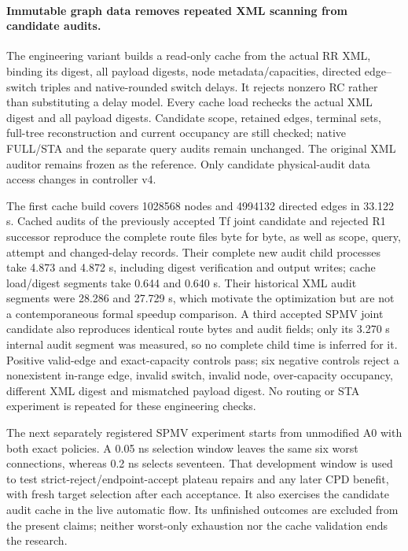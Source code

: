 \paragraph{Immutable graph data removes repeated XML scanning from candidate audits.}
The engineering variant builds a read-only cache from the actual RR XML, binding its digest, all payload digests, node metadata/capacities, directed edge--switch triples and native-rounded switch delays. It rejects nonzero RC rather than substituting a delay model. Every cache load rechecks the actual XML digest and all payload digests. Candidate scope, retained edges, terminal sets, full-tree reconstruction and current occupancy are still checked; native FULL/STA and the separate query audits remain unchanged. The original XML auditor remains frozen as the reference. Only candidate physical-audit data access changes in controller v4.

The first cache build covers 1028568 nodes and 4994132 directed edges in 33.122 s. Cached audits of the previously accepted Tf joint candidate and rejected R1 successor reproduce the complete route files byte for byte, as well as scope, query, attempt and changed-delay records. Their complete new audit child processes take 4.873 and 4.872 s, including digest verification and output writes; cache load/digest segments take 0.644 and 0.640 s. Their historical XML audit segments were 28.286 and 27.729 s, which motivate the optimization but are not a contemporaneous formal speedup comparison. A third accepted SPMV joint candidate also reproduces identical route bytes and audit fields; only its 3.270 s internal audit segment was measured, so no complete child time is inferred for it. Positive valid-edge and exact-capacity controls pass; six negative controls reject a nonexistent in-range edge, invalid switch, invalid node, over-capacity occupancy, different XML digest and mismatched payload digest. No routing or STA experiment is repeated for these engineering checks.

The next separately registered SPMV experiment starts from unmodified A0 with both exact policies. A 0.05 ns selection window leaves the same six worst connections, whereas 0.2 ns selects seventeen. That development window is used to test strict-reject/endpoint-accept plateau repairs and any later CPD benefit, with fresh target selection after each acceptance. It also exercises the candidate audit cache in the live automatic flow. Its unfinished outcomes are excluded from the present claims; neither worst-only exhaustion nor the cache validation ends the research.

